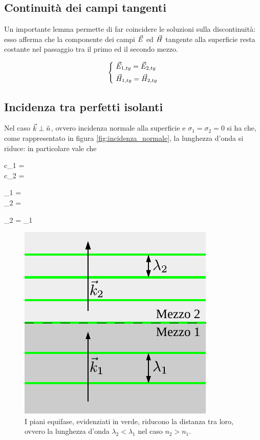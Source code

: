 \subsection{Continuità dei campi tangenti}
Un importante lemma permette di far coincidere le soluzioni sulla discontinuità: esso afferma che la componente dei campi $\vec{E}$ ed $\vec{H}$ tangente alla superficie resta costante nel passaggio tra il primo ed il secondo mezzo.

\begin{equation}
	\begin{dcases}
		~ \vec{E}_{1, tg} = \vec{E}_{2, tg} \\
		~ \vec{H}_{1, tg} = \vec{H}_{2, tg}
	\end{dcases}
\end{equation}

\subsection{Incidenza tra perfetti isolanti}
	Nel caso $\vec{k} \perp \hat{n}$, ovvero incidenza normale alla superficie e $\sigma_1 = \sigma_2 = 0$ si ha che, come rappresentato in figura \ref{fig:incidenza_normale}, la lunghezza d'onda si riduce: in particolare vale che

	\begin{esp}
		\begin{dcases}
			c_1 =  \\
			c_2 =  
		\end{dcases}
		\implies 
		\begin{dcases}
			\lambda_1 = \frac{\lambda_o}{n_1} \\
			\lambda_2 = \frac{\lambda_o}{n_2} 
		\end{dcases}
		\implies 
		\lambda_2 = \lambda_1 
	\end{esp}

	\begin{figure}[ht] \label{fig:incidenza_normale_isolanti}
		\centering
		\includegraphics{img/incidenza_normale.pdf}
		\caption{I piani equifase, evidenziati in verde, riducono la distanza tra loro, ovvero la lunghezza d'onda $\lambda_2 < \lambda_1$ nel caso $n_2 > n_1$.}
	\end{figure}

